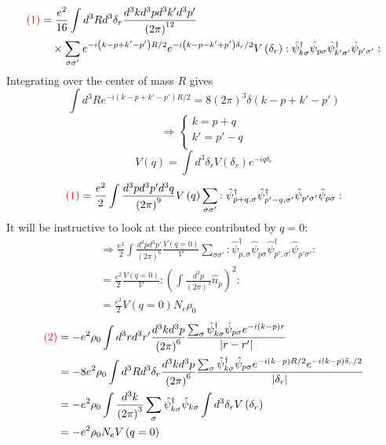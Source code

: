 \begin{align*}
    {\color{red} \left( 1 \right) }&=\frac{e^2}{16}\int{d^3Rd^3\delta _r\frac{d^3kd^3pd^3k'd^3p'}{\left( 2\pi \right) ^{12}}}\\
    &\quad \times \sum_{\sigma \sigma '}{e^{-i\left( k-p+k'-p' \right) R/2}e^{-i\left( k-p-k'+p' \right) \delta _r/2}V\left( \delta _r \right) :\hat{\psi}_{k\sigma}^{\dagger}\hat{\psi}_{p\sigma}\hat{\psi}_{k'\sigma '}^{\dagger}\hat{\psi}_{p'\sigma '}:}
\end{align*}
Integrating over the center of mass $R$ gives
\[ \int{d^3Re^{-i\left( k-p+k'-p' \right) R/2}}=8\left( 2\pi \right) ^3\delta \left( k-p+k'-p' \right) \]
\[ \Rightarrow \begin{cases}
	k=p+q\\
	k'=p'-q\\
\end{cases}\]
\[ V\left( q \right) =\int{d^3\delta _rV\left( \delta _r \right) e^{-iq\delta _r}}\]
\[ {\color{red} \left( 1 \right) }=\frac{e^2}{2}\int{\frac{d^3pd^3p'd^3q}{\left( 2\pi \right) ^9}V\left( q \right) \sum_{\sigma \sigma '}{:\hat{\psi}_{p+q,\sigma}^{\dagger}\hat{\psi}_{p'-q,\sigma '}^{\dagger}\hat{\psi}_{p'\sigma '}\hat{\psi}_{p\sigma}:}}\]
It will be instructive to look at the piece contributed by $q=0$:
\begin{align*}
    &\Rightarrow \frac{e^2}{2}\int{\frac{d^3pd^3p'}{\left( 2\pi \right) ^6}\frac{V\left( q=0 \right)}{\mathcal{V}}\sum_{\sigma \sigma '}{:\hat{\psi}_{p,\sigma}^{\dagger}\hat{\psi}_{p\sigma}\hat{\psi}_{p',\sigma '}^{\dagger}\hat{\psi}_{p'\sigma '}:}}\\
    & =\frac{e^2}{2}\frac{V\left( q=0 \right)}{\mathcal{V}}:\left( \int{\frac{d^3p}{\left( 2\pi \right) ^3}\hat{n}_p} \right) ^2:\\
    &=\frac{e^2}{2}V\left( q=0 \right) N_e\rho _0
\end{align*}
\begin{align*}
    {\color{red} \left( 2 \right) }&=-e^2\rho _0\int{d^3rd^3r'\frac{d^3kd^3p}{\left( 2\pi \right) ^6}\frac{\sum_{\sigma}{\hat{\psi}_{k\sigma}^{\dagger}\hat{\psi}_{p\sigma}e^{-i\left( k-p \right) r}}}{\left| r-r' \right|}}\\
    &=-8e^2\rho _0\int{d^3Rd^3\delta _r\frac{d^3kd^3p}{\left( 2\pi \right) ^6}\frac{\sum_{\sigma}{\hat{\psi}_{k\sigma}^{\dagger}\hat{\psi}_{p\sigma}e^{-i\left( k-p \right) R/2}e^{-i\left( k-p \right) \delta _r/2}}}{\left| \delta _r \right|}}\\
    &=-e^2\rho _0\int{\frac{d^3k}{\left( 2\pi \right) ^3}\sum_{\sigma}{\hat{\psi}_{k\sigma}^{\dagger}\hat{\psi}_{k\sigma}}}\int{d^3\delta _rV\left( \delta _r \right)}\\
    &=-e^2\rho _0N_eV\left( q=0 \right)
\end{align*}
